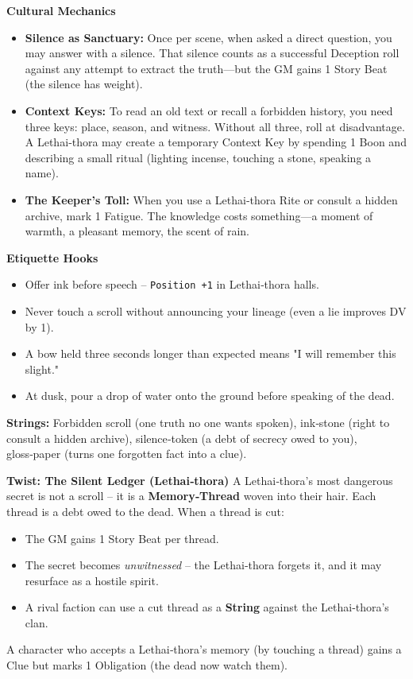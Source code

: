 \documentclass[12pt]{book}
\begin{document}
\begin{infobox}
\textbf{Cultural Mechanics}
\begin{itemize}
    \item \textbf{Silence as Sanctuary:} Once per scene, when asked a direct question, you may answer with a silence. That silence counts as a successful Deception roll against any attempt to extract the truth---but the GM gains 1 Story Beat (the silence has weight).
    \item \textbf{Context Keys:} To read an old text or recall a forbidden history, you need three keys: place, season, and witness. Without all three, roll at disadvantage. A Lethai‑thora may create a temporary Context Key by spending 1 Boon and describing a small ritual (lighting incense, touching a stone, speaking a name).
    \item \textbf{The Keeper's Toll:} When you use a Lethai‑thora Rite or consult a hidden archive, mark 1 Fatigue. The knowledge costs something---a moment of warmth, a pleasant memory, the scent of rain.
\end{itemize}
\textbf{Etiquette Hooks}
\begin{itemize}
    \item Offer ink before speech -- \texttt{Position +1} in Lethai‑thora halls.
    \item Never touch a scroll without announcing your lineage (even a lie improves DV by 1).
    \item A bow held three seconds longer than expected means "I will remember this slight."
    \item At dusk, pour a drop of water onto the ground before speaking of the dead.
\end{itemize}
\textbf{Strings:} Forbidden scroll (one truth no one wants spoken), ink‑stone (right to consult a hidden archive), silence‑token (a debt of secrecy owed to you), gloss‑paper (turns one forgotten fact into a clue).
\end{infobox}

\begin{infobox}
\textbf{Twist: The Silent Ledger (Lethai‑thora)}
A Lethai‑thora’s most dangerous secret is not a scroll – it is a \textbf{Memory‑Thread} woven into their hair. Each thread is a debt owed to the dead. When a thread is cut:
\begin{itemize}
    \item The GM gains 1 Story Beat per thread.
    \item The secret becomes \textit{unwitnessed} – the Lethai‑thora forgets it, and it may resurface as a hostile spirit.
    \item A rival faction can use a cut thread as a \textbf{String} against the Lethai‑thora’s clan.
\end{itemize}
A character who accepts a Lethai‑thora’s memory (by touching a thread) gains a Clue but marks 1 Obligation (the dead now watch them).
\end{infobox}
\end{document}
